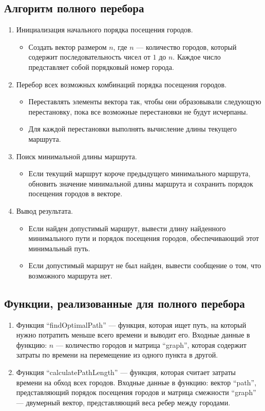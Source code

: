 \documentclass[12pt, a4paper]{article}
\begin{document}
\subsection{Алгоритм полного перебора}
\begin{enumerate}
    \item Инициализация начального порядка посещения городов.
    \begin{itemize}
        \item[---] Создать вектор размером $n$, где $n$ --- количество городов, который содержит последовательность чисел от $1$ до $n$. Каждое число представляет собой порядковый номер города.
    \end{itemize}
    \item Перебор всех возможных комбинаций порядка посещения городов.
    \begin{itemize}
        \item[---] Переставлять элементы вектора так, чтобы они образовывали следующую перестановку, пока все возможные перестановки не будут исчерпаны.
        \item[---] Для каждой перестановки выполнять вычисление длины текущего маршрута. 
    \end{itemize}
    \item Поиск минимальной длины маршрута.
    \begin{itemize}
        \item[---] Если текущий маршрут короче предыдущего минимального маршрута, обновить значение минимальной длины маршрута и сохранить порядок посещения городов в векторе.
    \end{itemize}
    \item Вывод результата.
    \begin{itemize}
        \item[---] Если найден допустимый маршрут, вывести длину найденного минимального пути и порядок посещения городов, обеспечивающий этот минимальный путь.
        \item[---] Если допустимый маршрут не был найден, вывести сообщение о том, что возможного маршрута нет. 
    \end{itemize}
\end{enumerate}

\subsection{Функции, реализованные для полного перебора}
\begin{enumerate}
    \item Функция ``findOptimalPath'' --- функция, которая ищет путь, на который нужно потратить меньше всего времени и выводит его. Входные данные в функцию: $n$ --- количество городов и матрица ``graph'', которая содержит затраты по времени на перемещение из одного пункта в другой.
    \item Функция ``calculatePathLength'' --- функция, которая считает затраты времени на обход всех городов. Входные данные в функцию: вектор ``path'', представляющий порядок посещения городов и матрица смежности ``graph'' --- двумерный вектор, представляющий веса ребер между городами. 
\end{enumerate}
\end{document}
